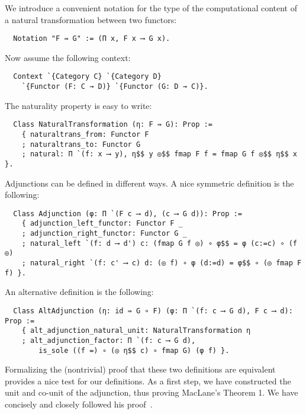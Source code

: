 \documentclass[a4paper,10pt,runningheads]{llncs}
\begin{document}
We introduce a convenient notation for the type of the computational content of a natural transformation between two functors:
\begin{lstlisting}
  Notation "F ⇛ G" := (Π x, F x ⟶ G x).
\end{lstlisting}
Now assume the following context:
\begin{lstlisting}
  Context `{Category C} `{Category D}
    `{Functor (F: C → D)} `{Functor (G: D → C)}.
\end{lstlisting}
The naturality property is easy to write:
\begin{lstlisting}
  Class NaturalTransformation (η: F ⇛ G): Prop :=
    { naturaltrans_from: Functor F
    ; naturaltrans_to: Functor G
    ; natural: Π `(f: x ⟶ y), η$$ y ◎$$ fmap F f = fmap G f ◎$$ η$$ x }.
\end{lstlisting}



Adjunctions can be defined in different ways. A nice symmetric definition is the following:
\begin{lstlisting}
  Class Adjunction (φ: Π `(F c ⟶ d), (c ⟶ G d)): Prop :=
    { adjunction_left_functor: Functor F _
    ; adjunction_right_functor: Functor G _
    ; natural_left `(f: d ⟶ d') c: (fmap G f ◎) ∘ φ$$ = φ (c:=c) ∘ (f ◎)
    ; natural_right `(f: c' ⟶ c) d: (◎ f) ∘ φ (d:=d) = φ$$ ∘ (◎ fmap F f) }.
\end{lstlisting}
An alternative definition is the following:
\begin{lstlisting}
  Class AltAdjunction (η: id ⇛ G ∘ F) (φ: Π `(f: c ⟶ G d), F c ⟶ d): Prop :=
    { alt_adjunction_natural_unit: NaturalTransformation η
    ; alt_adjunction_factor: Π `(f: c ⟶ G d),
        is_sole ((f =) ∘ (◎ η$$ c) ∘ fmap G) (φ f) }.
\end{lstlisting}
Formalizing the (nontrivial) proof that these two definitions are equivalent provides a nice test for our definitions. As a first step, we have constructed the unit and co-unit of the adjunction, thus proving MacLane's Theorem 1. We have concisely and closely followed his proof~\cite{CatWork}. %
\end{document}
